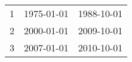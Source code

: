 % 
\begin{tabular}{ccc}
  \hline
  \hline
1 & 1975-01-01 & 1988-10-01 \\ 
  2 & 2000-01-01 & 2009-10-01 \\ 
  3 & 2007-01-01 & 2010-10-01 \\ 
   \hline
\end{tabular}
